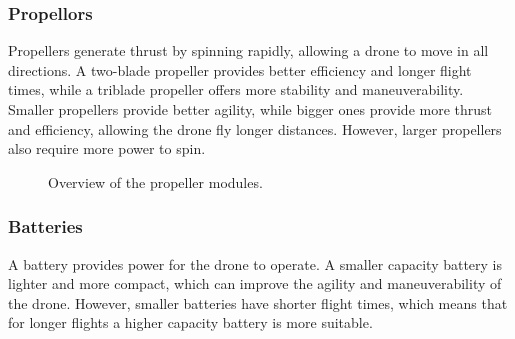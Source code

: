 \documentclass[sigconf,review]{acmart}
\begin{document}

\subsubsection{Propellors}
\label{sec:propellors}

Propellers generate thrust by spinning rapidly, allowing a drone to move in all directions. 
A two-blade propeller provides better efficiency and longer flight times, while a triblade propeller offers more stability and maneuverability. 
Smaller propellers provide better agility, while bigger ones provide more thrust and efficiency, allowing the drone fly longer distances. 
However, larger propellers also require more power to spin.

\begin{figure}[htbp]
    \hfill
    \hfill
    \caption{Overview of the propeller modules.}
    \label{fig:propeller}
\end{figure}

\subsubsection{Batteries}
\label{sec:batteries}

A battery provides power for the drone to operate. 
A smaller capacity battery is lighter and more compact, which can improve the agility and maneuverability of the drone. 
However, smaller batteries have shorter flight times, which means that for longer flights a higher capacity battery is more suitable.
\end{document}
